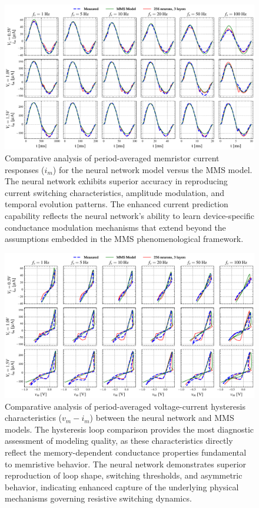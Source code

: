 \documentclass[11pt, oneside]{article}
\begin{document}
\begin{figure}[htbp!]
    \centering
    \includegraphics[width=\linewidth]{mms_results/simulated_ims.pdf}
    \caption{Comparative analysis of period-averaged memristor current responses ($i_m$) for the neural network model versus the MMS model. The neural network exhibits superior accuracy in reproducing current switching characteristics, amplitude modulation, and temporal evolution patterns. The enhanced current prediction capability reflects the neural network's ability to learn device-specific conductance modulation mechanisms that extend beyond the assumptions embedded in the MMS phenomenological framework.}
    \label{fig:mms_ims}
\end{figure}

\begin{figure}[htbp!]
    \centering
    \includegraphics[width=\linewidth]{mms_results/simulated_histeresis.pdf}
    \caption{Comparative analysis of period-averaged voltage-current hysteresis characteristics ($v_m - i_m$) between the neural network and MMS models. The hysteresis loop comparison provides the most diagnostic assessment of modeling quality, as these characteristics directly reflect the memory-dependent conductance properties fundamental to memristive behavior. The neural network demonstrates superior reproduction of loop shape, switching thresholds, and asymmetric behavior, indicating enhanced capture of the underlying physical mechanisms governing resistive switching dynamics.}
    \label{fig:mms_histeresis}
\end{figure}
\end{document}
